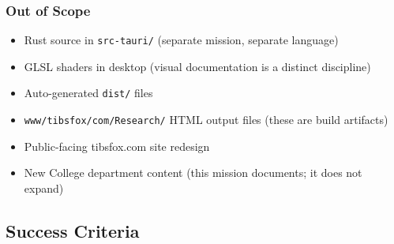 \documentclass[11pt,letterpaper]{article}
\begin{document}
\subsubsection{Out of Scope}

\begin{itemize}[noitemsep]
  \item Rust source in \texttt{src-tauri/} (separate mission, separate language)
  \item GLSL shaders in desktop (visual documentation is a distinct discipline)
  \item Auto-generated \texttt{dist/} files
  \item \texttt{www/tibsfox/com/Research/} HTML output files (these are build artifacts)
  \item Public-facing tibsfox.com site redesign
  \item New College department content (this mission documents; it does not expand)
\end{itemize}

\subsection{Success Criteria}
\end{document}
